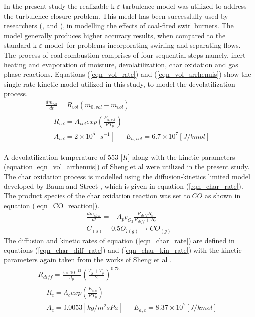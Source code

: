 \documentclass[twocolumn,10pt]{asme2ej}
\begin{document}
In the present study the realizable k-$\varepsilon$ turbulence model was utilized to address the turbulence closure problem. This model has been successfully used by researchers (\cite{Belosevic2019a},\cite{Laubscher2019a} and \cite{Modlinski2019}), in modelling the effects of coal-fired swirl burners. The model generally produces higher accuracy results, when compared to the standard k-$\varepsilon$ model, for problems incorporating swirling and separating flows.\\

The process of coal combustion comprises of four sequential steps namely, inert heating and evaporation of moisture, devolatilization, char oxidation and gas phase reactions. Equations (\ref{eqn_vol_rate}) and (\ref{eqn_vol_arrhenuis}) show the single rate kinetic model utilized in this study, to model the devolatilization process.
\begin{gather}
\frac{dm_{vol}}{dt} = R_{vol}(m_{0,vol}-m_{vol}) \label{eqn_vol_rate} \\
\begin{split}
&R_{vol} = A_{vol}exp\left(\frac{E_{a,vol}}{RT_p}\right)\\
&A_{vol} = 2\times10^5 [s^{-1}]\,\,\,\,\,\,\,\,\,\,E_{a,vol} = 6.7\times10^7 [J/kmol] \label{eqn_vol_arrhenuis}
\end{split}
\end{gather}

A devolatilization temperature of 553 [$K$] \cite{Ranade2015} along with the kinetic parameters (equation \ref{eqn_vol_arrhenuis}) of Sheng et al \cite{Sheng2004} were utilized in the present study.\\
\newpage
The char oxidation process is modelled using the diffusion-kinetics limited model developed by Baum and Street \cite{Baum1971}, which is given in equation (\ref{eqn_char_rate}). The product species of the char oxidation reaction was set to $CO$ as shown in equation (\ref{eqn_CO_reaction}). 
\begin{gather}
\frac{dm_{char}}{dt} = -A_p p_{O_{2}} \frac{R_{diff}R_c}{R_{diff} + R_c}  \label{eqn_char_rate}\\
C_{(s)}+0.5O_{2(g)}\to CO_{(g)} \label{eqn_CO_reaction}
\end{gather}
The diffusion and kinetic rates of equation (\ref{eqn_char_rate}) are defined in equations (\ref{eqn_char_diff_rate})  and (\ref{eqn_char_kin_rate}) with the kinetic parameters again taken from the works of Sheng et al \cite{Sheng2004}.
\begin{gather}
R_{diff} = \frac{5\times10^{-12}}{d_p} \left(\frac{T_g+T_p}{2}\right)^{0.75} \label{eqn_char_diff_rate}\\
\begin{split}
&R_{c} = A_{c}exp\left(\frac{E_{a,c}}{RT_p}\right)\\
&A_{c} = 0.0053 [kg/m^2sPa]\,\,\,\,\,\,\,\,\,\,E_{a,c} = 8.37\times10^7 [J/kmol]
\end{split}
 \label{eqn_char_kin_rate}
\end{gather}
\end{document}
